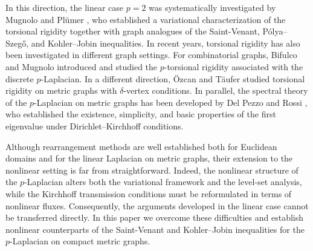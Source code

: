 \documentclass[12pt,a4paper]{article}
\numberwithin{equation}{section}
\begin{document}
In this direction, the linear case $p=2$ was systematically investigated
by Mugnolo and Pl\"umer \cite{MuPl}, who established a variational
characterization of the torsional rigidity together with graph analogues
of the Saint-Venant, P\'olya--Szeg\H{o}, and Kohler--Jobin inequalities.
In recent years, torsional rigidity has also been investigated in
different graph settings. For combinatorial graphs, Bifulco and Mugnolo
\cite{BM25} introduced and studied the $p$-torsional rigidity associated
with the discrete $p$-Laplacian. In a different direction, \"Ozcan and
T\"aufer \cite{OT24} studied torsional rigidity on metric graphs with
$\delta$-vertex conditions. In parallel, the spectral theory of the $p$-Laplacian on metric graphs
has been developed by Del Pezzo and Rossi \cite{DR}, who established the
existence, simplicity, and basic properties of the first eigenvalue
under Dirichlet--Kirchhoff conditions.

Although rearrangement methods are well established both for Euclidean
domains and for the linear Laplacian on metric graphs, their extension to
the nonlinear setting is far from straightforward. Indeed, the nonlinear
structure of the $p$-Laplacian alters both the variational framework and
the level-set analysis, while the Kirchhoff transmission conditions must
be reformulated in terms of nonlinear fluxes. Consequently, the arguments
developed in the linear case cannot be transferred directly. In this paper
we overcome these difficulties and establish nonlinear counterparts of the
Saint-Venant and Kohler--Jobin inequalities for the $p$-Laplacian on
compact metric graphs.
\end{document}
